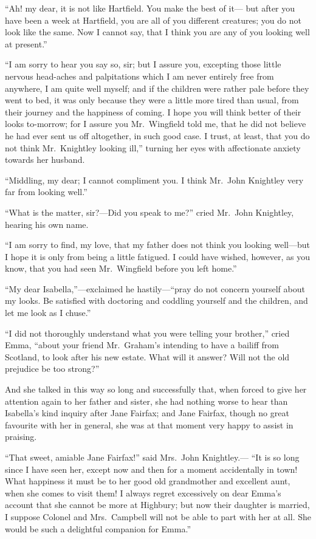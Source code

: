 ``Ah! my dear, it is not like Hartfield.  You make the best of it---%
but after you have been a week at Hartfield, you are all of you
different creatures; you do not look like the same.  Now I cannot say,
that I think you are any of you looking well at present.''

``I am sorry to hear you say so, sir; but I assure you, excepting those
little nervous head-aches and palpitations which I am never entirely
free from anywhere, I am quite well myself; and if the children were
rather pale before they went to bed, it was only because they were
a little more tired than usual, from their journey and the happiness
of coming.  I hope you will think better of their looks to-morrow;
for I assure you Mr.\ Wingfield told me, that he did not believe
he had ever sent us off altogether, in such good case.  I trust,
at least, that you do not think Mr.\ Knightley looking ill,''
turning her eyes with affectionate anxiety towards her husband.

``Middling, my dear; I cannot compliment you.  I think Mr.\ John
Knightley very far from looking well.''

``What is the matter, sir?---Did you speak to me?'' cried Mr.\ John
Knightley, hearing his own name.

``I am sorry to find, my love, that my father does not think you
looking well---but I hope it is only from being a little fatigued.
I could have wished, however, as you know, that you had seen
Mr.\ Wingfield before you left home.''

``My dear Isabella,''---exclaimed he hastily---``pray do not concern
yourself about my looks.  Be satisfied with doctoring and coddling
yourself and the children, and let me look as I chuse.''

``I did not thoroughly understand what you were telling your brother,''
cried Emma, ``about your friend Mr.\ Graham's intending to have a bailiff
from Scotland, to look after his new estate.  What will it answer?
Will not the old prejudice be too strong?''

And she talked in this way so long and successfully that, when forced
to give her attention again to her father and sister, she had nothing
worse to hear than Isabella's kind inquiry after Jane Fairfax;
and Jane Fairfax, though no great favourite with her in general,
she was at that moment very happy to assist in praising.

``That sweet, amiable Jane Fairfax!'' said Mrs.\ John Knightley.---%
``It is so long since I have seen her, except now and then for a moment
accidentally in town!  What happiness it must be to her good old
grandmother and excellent aunt, when she comes to visit them!
I always regret excessively on dear Emma's account that she cannot
be more at Highbury; but now their daughter is married, I suppose
Colonel and Mrs.\ Campbell will not be able to part with her at all.
She would be such a delightful companion for Emma.''

